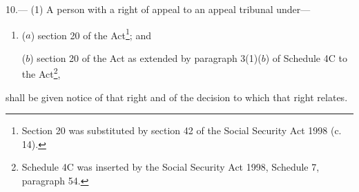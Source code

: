 \documentclass[a4paper,12pt]{article}
\begin{document}
10.—%
%
%
%
%
%
%
(1) A person with a right of appeal to an appeal tribunal under---
\begin{enumerate}\item[]
($a$) section 20 of the Act\footnote{\frenchspacing Section 20 was substituted by section 42 of the Social Security Act 1998 (c. 14).}; and

($b$) section 20 of the Act as extended by paragraph 3(1)($b$) of Schedule 4C to the Act\footnote{\frenchspacing Schedule 4C was inserted by the Social Security Act 1998, Schedule 7, paragraph 54.},
\end{enumerate}
shall be given notice of that right and of the decision to which that right relates.
\end{document}
